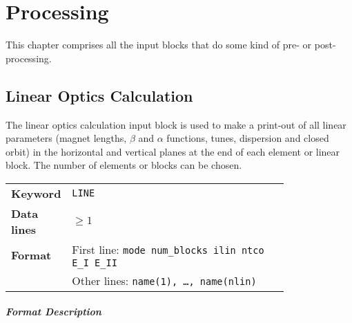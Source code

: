 
\chapter{Processing} \label{Proc}

This chapter comprises all the input blocks that do some kind of pre- or post-processing.

\section{Linear Optics Calculation} \label{LinOpt}

The linear optics calculation input block is used to make a print-out of all linear parameters (magnet lengths, $\beta$ and $\alpha$ functions, tunes, dispersion and closed orbit) in the horizontal and vertical planes at the end of each element or linear block.
The number of elements or blocks can be chosen.

\bigskip
\begin{tabular}{@{}lp{0.8\linewidth}}
    \textbf{Keyword}    & \texttt{LINE}\index{LINE} \\
    \textbf{Data lines} & $\geq 1$ \\
    \textbf{Format}     & First line: \texttt{mode num\_blocks ilin ntco E\_I E\_II} \\
                        & Other lines: \texttt{name(1), \dots , name(nlin)}
\end{tabular}

\paragraph{Format Description}~

